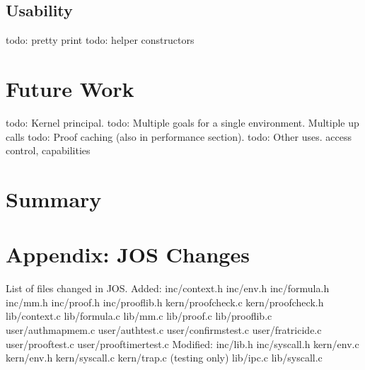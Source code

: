 \documentclass[10pt]{article}
\newcommand{\todo}[1]{{\color{red}todo: {#1}}}
\begin{document}
\subsection{Usability}
\todo{pretty print}
\newline
\todo{helper constructors}

\section{Future Work}
\todo{Kernel principal.}\newline
\todo{Multiple goals for a single environment. Multiple up calls}\newline
\todo{Proof caching (also in performance section).}\newline
\todo{Other uses. access control, capabilities}\newline

\section{Summary}

\section{Appendix: JOS Changes}
List of files changed in JOS. \newline
\newline
Added:\newline
inc/context.h \newline
inc/env.h \newline
inc/formula.h \newline
inc/mm.h \newline
inc/proof.h \newline
inc/prooflib.h \newline
kern/proofcheck.c \newline
kern/proofcheck.h \newline
lib/context.c \newline
lib/formula.c \newline
lib/mm.c \newline
lib/proof.c \newline
lib/prooflib.c \newline
user/authmapmem.c \newline
user/authtest.c \newline
user/confirmstest.c \newline
user/fratricide.c \newline
user/prooftest.c \newline
user/prooftimertest.c \newline
\newline
Modified: \newline
inc/lib.h \newline
inc/syscall.h \newline
kern/env.c \newline
kern/env.h \newline
kern/syscall.c \newline
kern/trap.c (testing only) \newline
lib/ipc.c \newline
lib/syscall.c \newline



\end{document}
